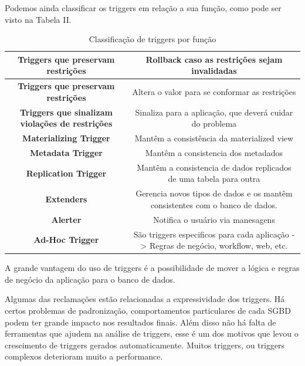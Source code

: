 \documentclass[conference]{IEEEtran}
\begin{document}
    Podemos ainda classificar os triggers em relação a sua função, como pode ser visto na Tabela II.
 \begin{table}[!t]
    \renewcommand{\arraystretch}{1}
    \caption{Classificação de triggers por função}
    \label{table_example}
    \centering
    \begin{tabular}{ c  c  }
      \hline 
           \bfseries Triggers que preservam restrições &
           Rollback caso as restrições sejam invalidadas \\
      \hline 
            \bfseries Triggers que preservam restrições &
           Altera o valor para se conformar as restrições \\
      \hline 
            \bfseries Triggers que sinalizam violações de restrições &
           Sinaliza para a aplicação, que deverá cuidar do problema \\
      \hline 
            \bfseries Materializing Trigger &
           Mantêm a consistência da materialized view \\
      \hline 
           \bfseries Metadata Trigger &
           Mantêm a consistencia dos metadados \\
      \hline 
           \bfseries Replication Trigger &
           Mantêm a consistencia de dados replicados de uma tabela para outra \\
      \hline 
           \bfseries Extenders &
           Gerencia novos tipos de dados e os mantêm consistentes com o banco de dados. \\
      \hline 
          \bfseries  Alerter &
           Notifica o usuário via manesagens \\
      \hline 
           \bfseries  Ad-Hoc Trigger &
            São triggers especificos para cada aplicação -> Regras de negócio, workflow, web, etc. \\
        \end{tabular}
    \end{table}

    A grande vantagem do uso de triggers é a possibilidade de mover a lógica e regras de negócio da aplicação para o banco de dados.

    Algumas das reclamações estão relacionadas a expressividade dos triggers. Há certos problemas de padronização, comportamentos particulares de cada SGBD podem ter grande impacto nos resultados finais. Além disso não há falta de ferramentas que ajudem na análise de triggers, esse é um dos motivos que levou o crescimento de triggers gerados automaticamente. Muitos triggers, ou triggers complexos deterioram muito a performance.
\end{document}
